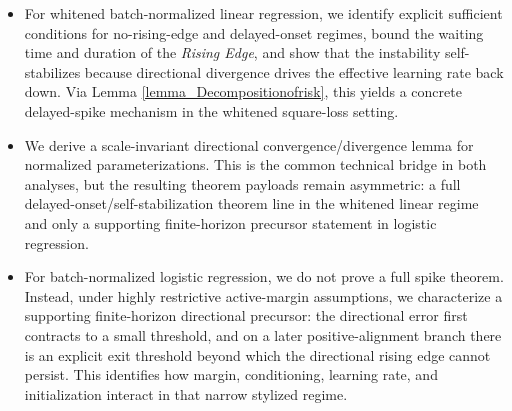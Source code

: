 \documentclass[pdflatex,sn-basic]{sn-jnl}%
\theoremstyle{thmstyleone}%
\begin{document}

\begin{itemize}
    \item For whitened batch-normalized linear regression, we identify explicit sufficient conditions for no-rising-edge and delayed-onset regimes, bound the waiting time and duration of the \textit{Rising Edge}, and show that the instability self-stabilizes because directional divergence drives the effective learning rate back down. Via Lemma \ref{lemma_Decompositionofrisk}, this yields a concrete delayed-spike mechanism in the whitened square-loss setting.

    \item We derive a scale-invariant directional convergence/divergence lemma for normalized parameterizations. This is the common technical bridge in both analyses, but the resulting theorem payloads remain asymmetric: a full delayed-onset/self-stabilization theorem line in the whitened linear regime and only a supporting finite-horizon precursor statement in logistic regression.

    \item For batch-normalized logistic regression, we do not prove a full spike theorem. Instead, under highly restrictive active-margin assumptions, we characterize a supporting finite-horizon directional precursor: the directional error first contracts to a small threshold, and on a later positive-alignment branch there is an explicit exit threshold beyond which the directional rising edge cannot persist. This identifies how margin, conditioning, learning rate, and initialization interact in that narrow stylized regime.
\end{itemize}
\end{document}
